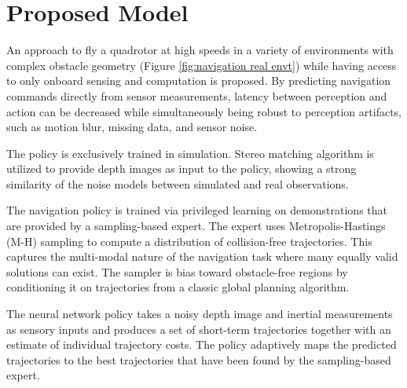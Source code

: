 \section{Proposed Model}
An approach to fly a quadrotor at high speeds in a variety of environments with complex obstacle geometry (Figure \ref{fig:navigation real envt}) while having access to only onboard sensing and computation is proposed. By predicting navigation commands directly from sensor measurements, latency between perception and action can be decreased while simultaneously being robust to perception artifacts, such as motion blur, missing data, and sensor noise. 

The policy is exclusively trained in simulation. Stereo matching algorithm\cite{stereoMatching} is utilized to provide depth images as input to the policy, showing a strong similarity of the noise models between simulated and real observations. 

The navigation policy is trained via privileged learning on demonstrations that are provided by a sampling-based expert. The expert uses Metropolis-Hastings\cite{MH_hasting} (M-H) sampling to compute a distribution of collision-free trajectories. This captures the multi-modal nature of the navigation task where many equally valid solutions can exist. The sampler is bias toward obstacle-free regions by conditioning it on trajectories from a classic global planning algorithm\cite{global_planning}.

The neural network policy takes a noisy depth image and inertial measurements as sensory inputs and produces a set of short-term trajectories together with an estimate of individual trajectory costs. The policy adaptively maps the predicted trajectories to the best trajectories that have been found by the sampling-based expert.

